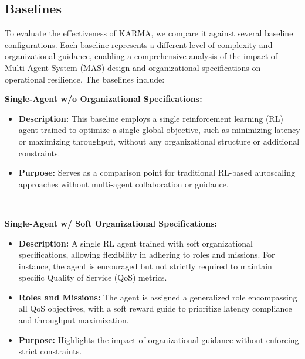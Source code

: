 \documentclass[conference]{IEEEtran}
\begin{document}
\subsection{Baselines}

To evaluate the effectiveness of KARMA, we compare it against several baseline configurations. Each baseline represents a different level of complexity and organizational guidance, enabling a comprehensive analysis of the impact of Multi-Agent System (MAS) design and organizational specifications on operational resilience. The baselines include:

\noindent \textbf{Single-Agent w/o Organizational Specifications:}
\begin{itemize}
    \item \textbf{Description:} This baseline employs a single reinforcement learning (RL) agent trained to optimize a single global objective, such as minimizing latency or maximizing throughput, without any organizational structure or additional constraints.
    \item \textbf{Purpose:} Serves as a comparison point for traditional RL-based autoscaling approaches without multi-agent collaboration or guidance.
\end{itemize}

\

\noindent \textbf{Single-Agent w/ Soft Organizational Specifications:}
\begin{itemize}
    \item \textbf{Description:} A single RL agent trained with soft organizational specifications, allowing flexibility in adhering to roles and missions. For instance, the agent is encouraged but not strictly required to maintain specific Quality of Service (QoS) metrics.
    \item \textbf{Roles and Missions:} The agent is assigned a generalized role encompassing all QoS objectives, with a soft reward guide to prioritize latency compliance and throughput maximization.
    \item \textbf{Purpose:} Highlights the impact of organizational guidance without enforcing strict constraints.
\end{itemize}

\
\end{document}
